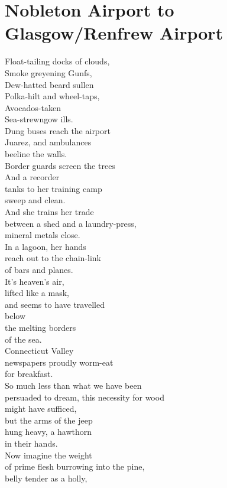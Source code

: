 \documentclass[smalldemyvopaper,11pt,twoside,onecolumn,openright,extrafontsizes]{memoir}
\begin{document}
\chapter{Nobleton Airport to Glasgow/Renfrew Airport}
Float-tailing docks of clouds,
\\Smoke greyening Gunfs,
\\Dew-hatted beard sullen
\\Polka-hilt and wheel-taps,
\\Avocados-taken
\\Sea-strewngow ills.
\\Dung buses reach the airport
\\Juarez, and ambulances
\\beeline the walls.
\\Border guards screen the trees
\\And a recorder
\\tanks to her training camp
\\sweep and clean.
\\And she trains her trade
\\between a shed and a laundry-press,
\\mineral metals close.
\\In a lagoon, her hands
\\reach out to the chain-link
\\of bars and planes.
\\It's heaven's air,
\\lifted like a mask,
\\and seems to have travelled
\\below
\\the melting borders
\\of the sea.
\\Connecticut Valley
\\newspapers proudly worm-eat
\\for breakfast.
\\So much less than what we have been
\\persuaded to dream, this necessity for wood
\\might have sufficed,
\\but the arms of the jeep
\\hung heavy, a hawthorn
\\in their hands.
\\Now imagine the weight
\\of prime flesh burrowing into the pine,
\\belly tender as a holly,
\end{document}
